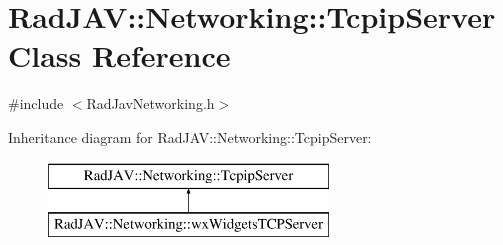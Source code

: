 \hypertarget{class_rad_j_a_v_1_1_networking_1_1_tcpip_server}{}\section{Rad\+J\+AV\+:\+:Networking\+:\+:Tcpip\+Server Class Reference}
\label{class_rad_j_a_v_1_1_networking_1_1_tcpip_server}


{\ttfamily \#include $<$Rad\+Jav\+Networking.\+h$>$}

Inheritance diagram for Rad\+J\+AV\+:\+:Networking\+:\+:Tcpip\+Server\+:\begin{figure}[H]
\begin{center}
\leavevmode
\includegraphics[height=2.000000cm]{class_rad_j_a_v_1_1_networking_1_1_tcpip_server}
\end{center}
\end{figure}
